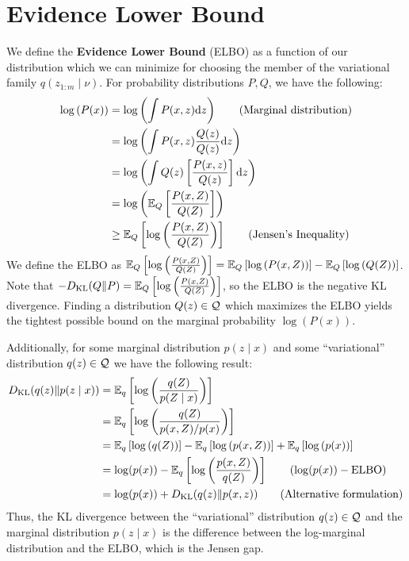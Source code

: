 \documentclass[11pt]{article}
\numberwithin{figure}{section}
\numberwithin{equation}{section}
\begin{document}
\section{Evidence Lower Bound}
We define the \textbf{Evidence Lower Bound} (ELBO) as a function of our distribution which we can minimize for choosing the member of the variational family $q(z_{1:m} \mid \nu)$. For probability distributions $P, Q$, we have the following: 
\begin{align*}
    \log\left(P(x)\right) &= \log\left(\int P(x, z)\textrm{d}z\right) \tag{Marginal distribution}\\
    &= \log\left(\int P(x, z)\frac{Q(z)}{Q(z)}\textrm{d}z\right)\\
    &= \log\left(\int Q(z)\left[\frac{P(x,z)}{Q(z)}\right]\textrm{d}z\right)\\
    &= \log\left(\mathbb{E}_{Q}\left[\frac{P(x, Z)}{Q(Z)}\right]\right)\\
    &\ge \mathbb{E}_{Q}\left[\log\left(\frac{P(x, Z)}{Q(Z)}\right)\right] \tag{Jensen's Inequality}
\end{align*}
We define the ELBO as $\mathbb{E}_{Q}\left[\log\left(\frac{P(x, Z)}{Q(Z)}\right)\right] = \mathbb{E}_{Q}\left[\log\left({P(x, Z)}\right)\right] - \mathbb{E}_{Q}\left[\log\left({Q(Z)}\right)\right]$. Note that $-D_{\textrm{KL}}({Q}\Vert{P}) = \mathbb{E}_{Q}\left[\log\left(\frac{P(x, Z)}{Q(Z)}\right)\right]$, so the ELBO is the negative KL divergence. Finding a distribution $Q(z) \in \mathcal{Q}$ which maximizes the ELBO yields the tightest possible bound on the marginal probability $\log(P(x))$. 

Additionally, for some marginal distribution $p(z \mid x)$ and some ``variational'' distribution $q(z) \in \mathcal{Q}$ we have the following result:
\begin{align*}
    \KLdiv{q(z)}{p(z \mid x)} &= \bbE_{q}\left[\log\left(\frac{q(Z)}{p(Z \mid x)}\right)\right]\\
    &= \bbE_{q}\left[\log\left(\frac{q(Z)}{p(x, Z)/p(x)}\right)\right]\\
    &= \bbE_{q}\left[\log\left({q(Z)}\right)\right] - \bbE_{q}\left[\log\left({p(x, Z)}\right)\right] + \bbE_{q}\left[\log\left({p(x)}\right)\right]\\
    &= \log(p(x)) - \bbE_{q}\left[\log\left(\frac{p(x, Z)}{q(Z)}\right)\right] \tag{$\log(p(x)) - \textrm{ELBO}$}\\
    &= \log(p(x)) + \KLdiv{q(z)}{p(x, z)} \tag{Alternative formulation}
\end{align*}
Thus, the KL divergence between the ``variational'' distribution $q(z) \in \mathcal{Q}$ and the marginal distribution $p(z \mid x)$ is the difference between the log-marginal distribution and the ELBO, which is the Jensen gap.
\end{document}
